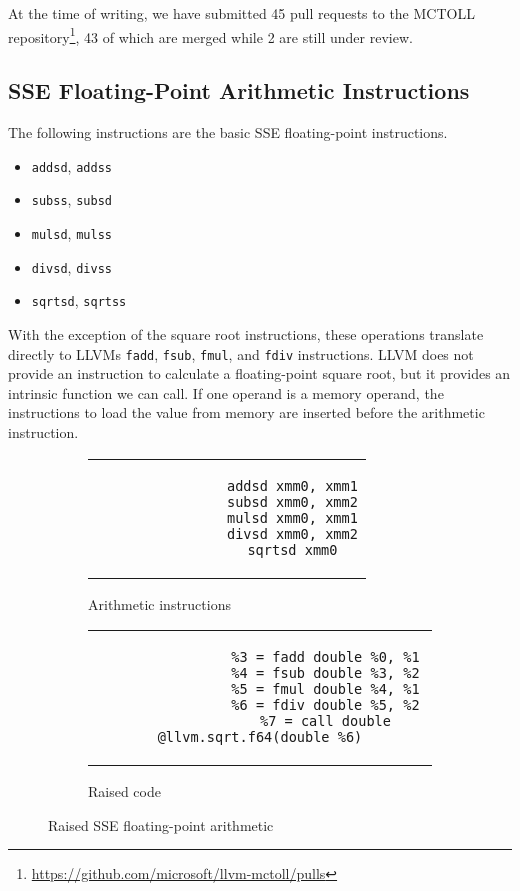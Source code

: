At the time of writing, we have submitted 45 pull requests to the MCTOLL repository\footnote{\url{https://github.com/microsoft/llvm-mctoll/pulls}}, 43 of which are merged while 2 are still under review.

\subsection{SSE Floating-Point Arithmetic Instructions}\label{subsec:sse-floating-point-arithmetic-instructions}

The following instructions are the basic SSE floating-point instructions.

\begin{itemize}
    \item \texttt{addsd}, \texttt{addss}
    \item \texttt{subss}, \texttt{subsd}
    \item \texttt{mulsd}, \texttt{mulss}
    \item \texttt{divsd}, \texttt{divss}
    \item \texttt{sqrtsd}, \texttt{sqrtss}
\end{itemize}

With the exception of the square root instructions, these operations translate directly to LLVMs \texttt{fadd}, \texttt{fsub}, \texttt{fmul}, and \texttt{fdiv} instructions.
LLVM does not provide an instruction to calculate a floating-point square root, but it provides an intrinsic function we can call.
If one operand is a memory operand, the instructions to load the value from memory are inserted before the arithmetic instruction.

\begin{figure}[htpb]
    \centering
    \begin{subfigure}{.4\textwidth}
        \begin{tabular}{c}
            \begin{lstlisting}
                addsd xmm0, xmm1
                subsd xmm0, xmm2
                mulsd xmm0, xmm1
                divsd xmm0, xmm2
                sqrtsd xmm0
            \end{lstlisting}
        \end{tabular}
        \caption{Arithmetic instructions}
    \end{subfigure}
    \hfill%
    \begin{subfigure}{.55\textwidth}
        \begin{tabular}{c}
            \begin{lstlisting}
                %3 = fadd double %0, %1
                %4 = fsub double %3, %2
                %5 = fmul double %4, %1
                %6 = fdiv double %5, %2
                %7 = call double @llvm.sqrt.f64(double %6)
            \end{lstlisting}
        \end{tabular}
        \caption{Raised code}
    \end{subfigure}
    \caption{Raised SSE floating-point arithmetic}
    \label{fig:raised-fp-arithmetic}
\end{figure}

